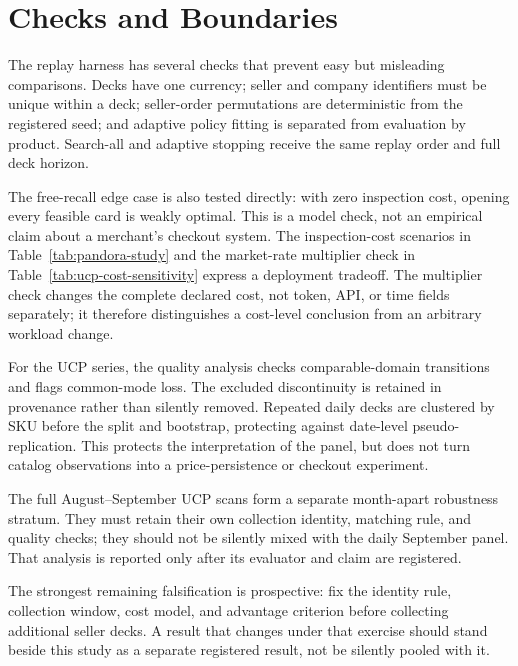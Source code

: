 \section{Checks and Boundaries}
\label{sec:robustness}

The replay harness has several checks that prevent easy but misleading comparisons.
Decks have one currency; seller and company identifiers must be unique within a deck;
seller-order permutations are deterministic from the registered seed; and adaptive
policy fitting is separated from evaluation by product. Search-all and adaptive
stopping receive the same replay order and full deck horizon.

The free-recall edge case is also tested directly: with zero inspection cost, opening
every feasible card is weakly optimal. This is a model check, not an empirical claim
about a merchant's checkout system. The inspection-cost scenarios in
Table~\ref{tab:pandora-study} and the market-rate multiplier check in
Table~\ref{tab:ucp-cost-sensitivity} express a deployment tradeoff. The multiplier
check changes the complete declared cost, not token, API, or time fields separately;
it therefore distinguishes a cost-level conclusion from an arbitrary workload change.

For the UCP series, the quality analysis checks comparable-domain transitions and
flags common-mode loss. The excluded discontinuity is retained in provenance rather
than silently removed. Repeated daily decks are clustered by SKU before the split and
bootstrap, protecting against date-level pseudo-replication. This protects the
interpretation of the panel, but does not turn catalog observations into a
price-persistence or checkout experiment.

The full August--September UCP scans form a separate month-apart robustness stratum.
They must retain their own collection identity, matching rule, and quality checks;
they should not be silently mixed with the daily September panel. That analysis is
reported only after its evaluator and claim are registered.

The strongest remaining falsification is prospective: fix the identity rule,
collection window, cost model, and advantage criterion before collecting additional
seller decks. A result that changes under that exercise should stand beside this
study as a separate registered result, not be silently pooled with it.